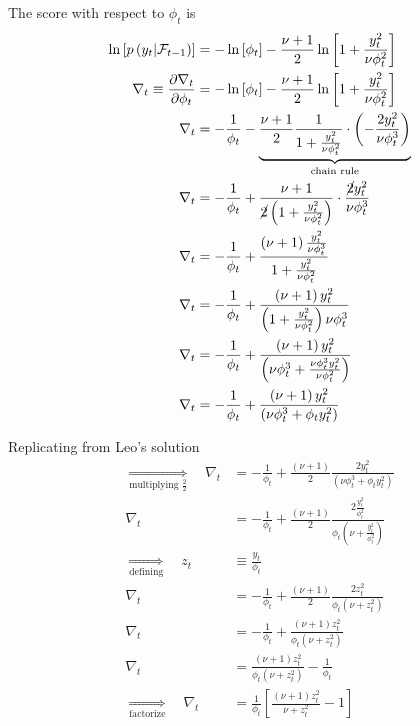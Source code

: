 \documentclass{article}
\begin{document}
The score with respect to $\phi_{t}$ is
\begin{align*}
\ln\left[p\left(y_{t}\rvert\mathcal{F}_{t-1}\right)\right] & =-\ln\left[\phi_{t}\right]-\frac{\nu+1}{2}\ln\left[1+\frac{y_{t}^{2}}{\nu\phi_{t}^{2}}\right]\\
\nabla_{t}\equiv\frac{\partial\nabla_{t}}{\partial\phi_{t}} & =-\ln\left[\phi_{t}\right]-\frac{\nu+1}{2}\ln\left[1+\frac{y_{t}^{2}}{\nu\phi_{t}^{2}}\right]\\
\nabla_{t} & =-\frac{1}{\phi_{t}}-\underbrace{\frac{\nu+1}{2}\frac{1}{1+\frac{y_{t}^{2}}{\nu\phi_{t}^{2}}}\cdot\left(-\frac{2y_{t}^{2}}{\nu\phi_{t}^{3}}\right)}_{\text{chain rule}}\\
\nabla_{t} & =-\frac{1}{\phi_{t}}+\frac{\nu+1}{\cancel{2}\left(1+\frac{y_{t}^{2}}{\nu\phi_{t}^{2}}\right)}\cdot\frac{\cancel{2}y_{t}^{2}}{\nu\phi_{t}^{3}}\\
\nabla_{t} & =-\frac{1}{\phi_{t}}+\frac{\left(\nu+1\right)\frac{y_{t}^{2}}{\nu\phi_{t}^{3}}}{1+\frac{y_{t}^{2}}{\nu\phi_{t}^{2}}}\\
\nabla_{t} & =-\frac{1}{\phi_{t}}+\frac{\left(\nu+1\right)y_{t}^{2}}{\left(1+\frac{y_{t}^{2}}{\nu\phi_{t}^{2}}\right)\nu\phi_{t}^{3}}\\
\nabla_{t} & =-\frac{1}{\phi_{t}}+\frac{\left(\nu+1\right)y_{t}^{2}}{\left(\nu\phi_{t}^{3}+\frac{\nu\phi_{t}^{3}y_{t}^{2}}{\nu\phi_{t}^{2}}\right)}\\
\nabla_{t} & =-\frac{1}{\phi_{t}}+\frac{\left(\nu+1\right)y_{t}^{2}}{\left(\nu\phi_{t}^{3}+\phi_{t}y_{t}^{2}\right)}
\end{align*}

Replicating from Leo's solution
\begin{align*}
\underset{\text{multiplying }\frac{2}{2}}{\Longrightarrow}\quad\nabla_{t} & =-\frac{1}{\phi_{t}}+\frac{\left(\nu+1\right)}{2}\frac{2y_{t}^{2}}{\left(\nu\phi_{t}^{3}+\phi_{t}y_{t}^{2}\right)}\\
\nabla_{t} & =-\frac{1}{\phi_{t}}+\frac{\left(\nu+1\right)}{2}\frac{2\frac{y_{t}^{2}}{\phi_{t}^{2}}}{\phi_{t}\left(\nu+\frac{y_{t}^{2}}{\phi_{t}^{2}}\right)}\\
\underset{\text{defining}}{\Longrightarrow}\quad z_{t} & \equiv\frac{y_{t}}{\phi_{t}}\\
\nabla_{t} & =-\frac{1}{\phi_{t}}+\frac{\left(\nu+1\right)}{2}\frac{2z_{t}^{2}}{\phi_{t}\left(\nu+z_{t}^{2}\right)}\\
\nabla_{t} & =-\frac{1}{\phi_{t}}+\frac{\left(\nu+1\right)z_{t}^{2}}{\phi_{t}\left(\nu+z_{t}^{2}\right)}\\
\nabla_{t} & =\frac{\left(\nu+1\right)z_{t}^{2}}{\phi_{t}\left(\nu+z_{t}^{2}\right)}-\frac{1}{\phi_{t}}\\
\underset{\text{factorize}}{\Longrightarrow}\quad\nabla_{t} & =\frac{1}{\phi_{t}}\left[\frac{\left(\nu+1\right)z_{t}^{2}}{\nu+z_{t}^{2}}-1\right]
\end{align*}
\end{document}
